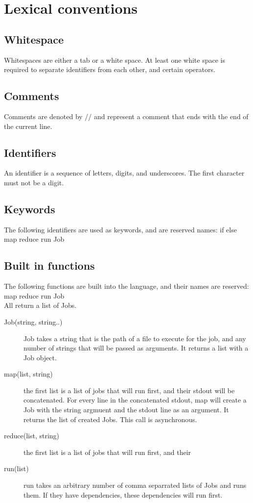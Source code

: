 \documentclass[12pt]{article}
\begin{document}
\section{Lexical conventions}
\subsection{Whitespace}
Whitespaces are either a tab or a white space. At least one white space is required to separate identifiers from
each other, and certain operators.

\subsection{Comments}
Comments are denoted by // and represent a comment that ends with the end of the current line.

\subsection{Identifiers}
An identifier is a sequence of letters, digits, and underscores. The first character must not be a digit.

\subsection{Keywords}
The following identifiers are used as keywords, and are reserved names:
if else map reduce run Job

\subsection{Built in functions}
The following functions are built into the language, and their names are reserved:\\
map reduce run Job\\
All return a list of Jobs.
\begin{description}
  \item[Job(string, string..)] Job takes a string that is the path of a file to
    execute for the job, and any number of strings that will be passed as
    arguments. It returns a list with a Job object.
  \item[map(list, string)] the first list is a list of jobs that will run first, and their
    stdout will be concatenated. For every line in the concatenated stdout, map will create
    a Job with the string argmuent and the stdout line as an argument. It returns the list
    of created Jobs. This call is asynchronous.
  \item[reduce(list, string)] the first list is a list of jobs that will run first, and their

  \item[run(list)] run takes an arbitrary number of comma separrated lists of Jobs
    and runs them. If they have dependencies, these dependencies will run first.
\end{description}
\end{document}
